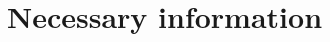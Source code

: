 \documentclass[oneside,11pt]{amsart}
\begin{document}
\section{Necessary information}
\bigskip
%
%
%
%
%
%
%
%
%
%
%
%
%
%
%
\end{document}
